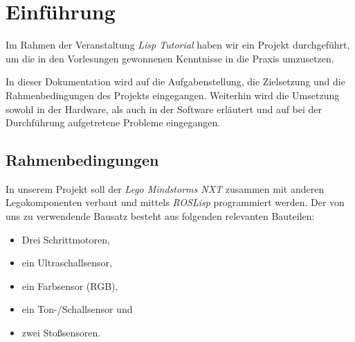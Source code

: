 \documentclass{fetch-my-doc}
\begin{document}
	\sloppy
	
	\addtolength{\textheight}{\versch}
	\tableofcontents
	\clearpage
	
	
	
	\section{Einführung}\label{sec:Einfuehrung}
		Im Rahmen der Veranstaltung \textit{Lisp Tutorial} haben wir ein Projekt durchgeführt, um die in den Vorlesungen gewonnenen Kenntnisse in die Praxis umzusetzen.
		
		In dieser Dokumentation wird auf die Aufgabenstellung, die Zielsetzung und die Rahmenbedingungen des Projekts eingegangen. Weiterhin wird die Umsetzung sowohl in der Hardware, als auch in der Software erläutert und auf bei der Durchführung aufgetretene Probleme eingegangen.
    
    \subsection{Rahmenbedingungen}\label{sec:rahmenbedingungen}
      In unserem Projekt soll der \textit{Lego Mindstorms NXT} zusammen mit anderen Legokomponenten verbaut und mittels \textit{ROSLisp} programmiert werden.
      Der von uns zu verwendende Bausatz besteht aus folgenden relevanten Bauteilen:
      \begin{itemize}
        \item Drei Schrittmotoren,
        \item ein Ultraschallsensor,
        \item ein Farbsensor (RGB),
        \item ein Ton-/Schallsensor und
        \item zwei Stoßsensoren.
      \end{itemize}
    
\end{document}
